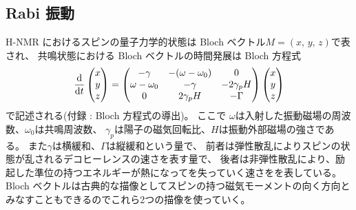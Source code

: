 \documentclass[11pt,dvipdfmx,a4paper]{jsarticle}
\begin{document}
\subsection{Rabi 振動}
H-NMR におけるスピンの量子力学的状態は Bloch ベクトル\(M = (x,\,y,\,z)\)で表され、
共鳴状態における Bloch ベクトルの時間発展は Bloch 方程式
\begin{equation}
	\dv{t}
	\begin{pmatrix}
		x\\ y\\ z
	\end{pmatrix}
	=
	\begin{pmatrix}
		-\gamma & -(\omega-\omega_0) & 0\\
		\omega -\omega_0 & -\gamma & -2\gamma_p H\\
		0 & 2\gamma_p H & -\Gamma
	\end{pmatrix}
	\begin{pmatrix}
		x\\ y\\ z
	\end{pmatrix}
\end{equation}
で記述される(付録 : Bloch 方程式の導出)。
ここで
\(\omega\)は入射した振動磁場の周波数、\(\omega_0\)は共鳴周波数、
\(\gamma_p\)は陽子の磁気回転比、\(H\)は振動外部磁場の強さである。
また\(\gamma\)は横緩和、\(\Gamma\)は縦緩和という量で、
前者は弾性散乱によりスピンの状態が乱されるデコヒーレンスの速さを表す量で、
後者は非弾性散乱により、励起した準位の持つエネルギーが熱になってを失っていく速さをを表している。 %
Bloch ベクトルは古典的な描像としてスピンの持つ磁気モーメントの向く方向とみなすこともできるのでこれら2つの描像を使っていく。
\end{document}
